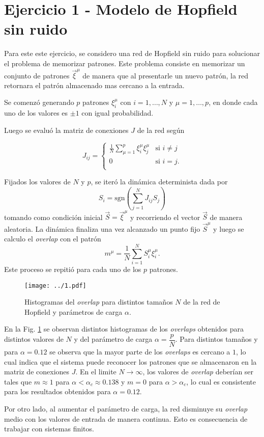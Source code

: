 \section*{Ejercicio 1 - Modelo de Hopfield sin ruido}

Para este este ejercicio, se considero una red de Hopfield sin ruido para solucionar el problema de memorizar patrones. Este problema consiste en memorizar un conjunto de patrones $\vec{\xi}^{\mu}$ de manera que al presentarle un nuevo patrón, la red retornara el patrón almacenado mas cercano a la entrada.

Se comenzó generando $p$ patrones $\xi_{i}^{\mu}$ con $i=1,\dots,N$ y $\mu=1,\dots,p$, en donde cada uno de los valores es $\pm1$ con igual probabilidad.

Luego se evaluó la matriz de conexiones $J$ de la red según

\begin{equation}
    J_{ij} =
    \left\{ \begin{array}{lcc}
        \frac{1}{N} \sum_{\mu=1}^{p} \xi_{i}^{\mu} \xi_{j}^{\mu}  & \text{si } i\neq j \\
        0           & \text{si } i=j. \\
        \end{array}
    \right.
\end{equation}

Fijados los valores de $N$ y $p$, se iteró la dinámica determinista dada por 
\begin{equation}
    S_{i} = \text{sgn} \left( \sum_{j=1}^{N} J_{ij} S_{j} \right)
\end{equation}
tomando como condición inicial $\vec{S} = \vec{\xi}^{\mu}$ y recorriendo el vector $\vec{S}$ de manera aleatoria. La dinámica finaliza una vez alcanzado un punto fijo $\vec{S}^{\mu}$ y luego se calculo el \textit{overlap} con el patrón
\begin{equation}
    m^{\mu} = \frac{1}{N}\sum_{i=1}^{N} S_{i}^{\mu} \xi_{i}^{\mu}.
\end{equation}
Este proceso se repitió para cada uno de los $p$ patrones.



\begin{figure}[htb!]
    \centering
    \texttt{[image: ../1.pdf]}
    \caption{Histogramas del \textit{overlap} para distintos tamaños $N$ de la red de Hopfield y parámetros de carga $\alpha$.}
    \label{fig:01}
\end{figure}

En la Fig. \ref{fig:01} se observan distintos histogramas de los \textit{overlaps} obtenidos para distintos valores de $N$ y del parámetro de carga $\alpha = \dfrac{p}{N}$. Para distintos tamaños y para $\alpha=0.12$ se observa que la mayor parte de los \textit{overlaps} es cercano a $1$, lo cual indica que el sistema puede reconocer los patrones que se almacenaron en la matriz de conexiones $J$. En el limite $N\rightarrow\infty$, los valores de \textit{overlap} deberían ser tales que $m\approx1$ para $\alpha < \alpha_{c} \approx 0.138$ y $m=0$ para $\alpha > \alpha_{c}$, lo cual es consistente para los resultados obtenidos para $\alpha = 0.12$.

Por otro lado, al aumentar el parámetro de carga, la red disminuye su \textit{overlap} medio con los valores de entrada de manera continua. Esto es consecuencia de trabajar con sistemas finitos. 